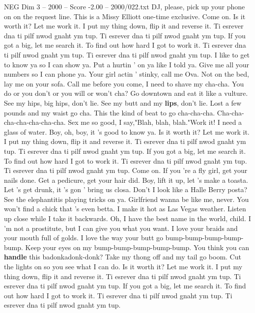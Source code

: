 \begin{textsample}{NEG Dim 3 – 2000 – Score -2.00 – 2000/022.txt}  \label{ex:f3_neg_012}
DJ, please, pick up your phone on on the request line.
This is a Missy Elliott one-time exclusive.
Come on.
Is it worth it?
Let me work it.
I put my thing down, flip it and reverse it.
Ti esrever dna ti pilf nwod gnaht ym tup.
Ti esrever dna ti pilf nwod gnaht ym tup.
If you got a big, let me search it.
To find out how hard I got to work it.
Ti esrever dna ti pilf nwod gnaht ym tup.
Ti esrever dna ti pilf nwod gnaht ym tup.
I like to get to know ya so I can show ya.
Put a hurtin ' on ya like I told ya.
Give me all your numbers so I can phone ya.
Your girl actin ' stinky, call me Ova.
Not on the bed, lay me on your sofa.
Call me before you come, I need to shave my cha-cha.
You do or you don't or you will or won't cha?
Go downtown and eat it like a vulture.
See my hips, big hips, don't lie.
See my butt and my \textbf{lips}, don't lie.
Lost a few pounds and my waist go cha.
This the kind of beat to go cha-cha-cha.
Cha-cha-cha-cha-cha-cha-cha.
Sex me so good, I say,"Blah, blah, blah."Work it!
I need a glass of water.
Boy, oh, boy, it 's good to know ya.
Is it worth it?
Let me work it.
I put my thing down, flip it and reverse it.
Ti esrever dna ti pilf nwod gnaht ym tup.
Ti esrever dna ti pilf nwod gnaht ym tup.
If you got a big, let me search it.
To find out how hard I got to work it.
Ti esrever dna ti pilf nwod gnaht ym tup.
Ti esrever dna ti pilf nwod gnaht ym tup.
Come on.
If you 're a fly girl, get your nails done.
Get a pedicure, get your hair did.
Boy, lift it up, let 's make a toasta.
Let 's get drunk, it 's gon ' bring us closa.
Don't I look like a Halle Berry posta?
See the elephantitis playing tricks on ya.
Girlfriend wanna be like me, never.
You won't find a chick that 's even betta.
I make it hot as Las Vegas weather.
Listen up close while I take it backwards.
Oh, I have the best name in the world, child.
I 'm not a prostitute, but I can give you what you want.
I love your braids and your mouth full of golds.
I love the way your butt go bump-bump-bump-bump-bump.
Keep your eyes on my bump-bump-bump-bump-bump.
You think you can \textbf{handle} this badonkadonk-donk?
Take my thong off and my tail go boom.
Cut the lights on so you see what I can do.
Is it worth it?
Let me work it.
I put my thing down, flip it and reverse it.
Ti esrever dna ti pilf nwod gnaht ym tup.
Ti esrever dna ti pilf nwod gnaht ym tup.
If you got a big, let me search it.
To find out how hard I got to work it.
Ti esrever dna ti pilf nwod gnaht ym tup.
Ti esrever dna ti pilf nwod gnaht ym tup.

\end{textsample}
